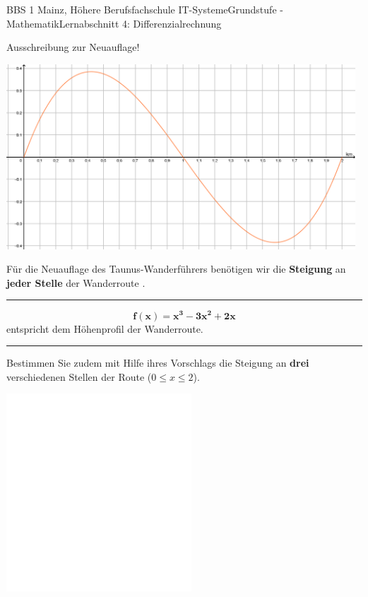 \documentclass[oneside,openany,headings=optiontotoc,11pt,numbers=noenddot]{scrreprt}
\begin{document}
	\begin{worksheet}{BBS 1 Mainz, Höhere Berufsfachschule IT-Systeme}{Grundstufe - Mathematik}{Lernabschnitt 4: Differenzialrechnung}
		\begin{framed}
			\Huge{Ausschreibung zur Neuauflage!}\\ \normalsize
			\par\noindent
			\begin{minipage}{0.45\textwidth}
				\includegraphics[width=0.98\textwidth,align=t]{../99_Bilder/190219_ExamenProb.png}
			\end{minipage}
			\hfill
			\begin{minipage}{0.54\textwidth}
				Für die Neuauflage des Taunus-Wanderführers benötigen wir die \textbf{Steigung} an \textbf{jeder Stelle} der Wanderroute . \\
				\rule{0.98\textwidth}{0.1pt}
				\[\mathbf{f(x) = x^3 - 3x^2 + 2x}\] entspricht dem Höhenprofil der Wanderroute.
			\end{minipage}
			\par\bigskip\noindent
			\rule{\textwidth}{0.1pt}
			Bestimmen Sie zudem mit Hilfe ihres Vorschlags die Steigung an \textbf{drei} verschiedenen Stellen der Route (\(0 \leq{} x \leq{} 2\)).
		\end{framed}
		\begin{framed}
			\noindent
			\includegraphics[width=0.52\textwidth]{../../empty.jpg}\\

\end{framed}
\end{worksheet}
\end{document}
